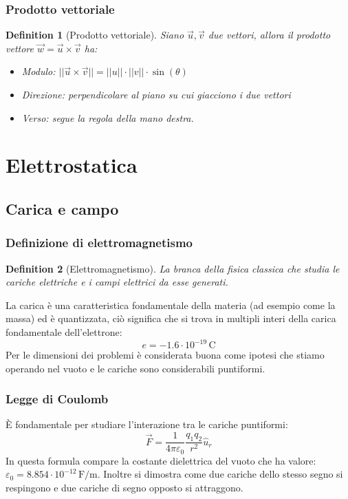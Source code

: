 \documentclass[12pt, a4paper]{article}
\newtheorem{definition}{Definition}[section]
\begin{document}
\subsubsection{Prodotto vettoriale}
\begin{definition}[Prodotto vettoriale]
Siano $\vec{u}, \vec{v}$ due vettori, allora il prodotto vettore $\vec{w} = \vec{u} \times \vec{v}$ ha:
\begin{itemize}
    \item Modulo: $||\vec{u} \times \vec{v}|| = ||u|| \cdot ||v|| \cdot \sin(\theta)$
    \item Direzione: perpendicolare al piano su cui giacciono i due vettori
    \item Verso: segue la regola della mano destra.
\end{itemize}
\end{definition}

\newpage

\section{Elettrostatica}
\subsection{Carica e campo}
\subsubsection{Definizione di elettromagnetismo}

\begin{definition}[Elettromagnetismo]
La branca della fisica classica che studia le cariche elettriche e i campi elettrici da esse generati.
\end{definition}

La carica è una caratteristica fondamentale della materia (ad esempio come la massa) ed è quantizzata, ciò significa che si trova in multipli interi della carica fondamentale dell'elettrone:
\[
e = -1.6 \cdot 10^{-19} \, \text{C}
\]
Per le dimensioni dei problemi è considerata buona come ipotesi che stiamo operando nel vuoto e le cariche sono considerabili puntiformi.

\subsubsection{Legge di Coulomb}
È fondamentale per studiare l'interazione tra le cariche puntiformi:
\[
\vec{F} = \frac{1}{4\pi\varepsilon_0} \frac{q_1 q_2}{r^2} \hat{u}_r
\]
In questa formula compare la costante dielettrica del vuoto che ha valore: $\varepsilon_0 = 8.854 \cdot 10^{-12} \, \text{F/m}$.
Inoltre si dimostra come due cariche dello stesso segno si respingono e due cariche di segno opposto si attraggono.
\end{document}
